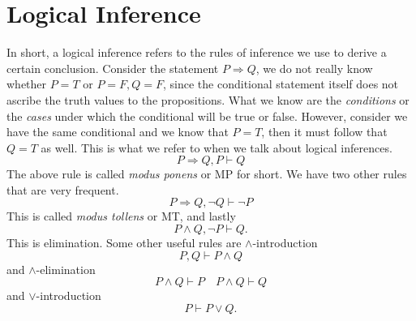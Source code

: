 \section{Logical Inference}

In short, a logical inference refers to the rules of inference we use to derive a certain conclusion. Consider the statement $P\Rightarrow Q$, we do not really know whether $P=T\text{ or }P=F,Q=F$, since the conditional statement itself does not ascribe the truth values to the propositions. What we know are the \emph{conditions} or the \emph{cases} under which the conditional will be true or false. However, consider we have the same conditional and we know that $P=T$, then it must follow that $Q=T$ as well. This is what we refer to when we talk about logical inferences.
$$
P\Rightarrow Q, P \vdash Q
$$
The above rule is called \emph{modus ponens} or MP for short. We have two other rules that are very frequent. 
$$
P\Rightarrow Q,\neg Q\vdash \neg P
$$
This is called \emph{modus tollens} or MT, and lastly 
$$
P\land Q,\neg P\vdash Q.
$$
This is elimination.\newline
Some other useful rules are $\land$-introduction 
$$
P,Q\vdash P\land Q
$$
and $\land$-elimination 
$$
P\land Q\vdash P\quad P\land Q\vdash Q
$$
and $\lor$-introduction 
$$
P\vdash P\lor Q.
$$




 
